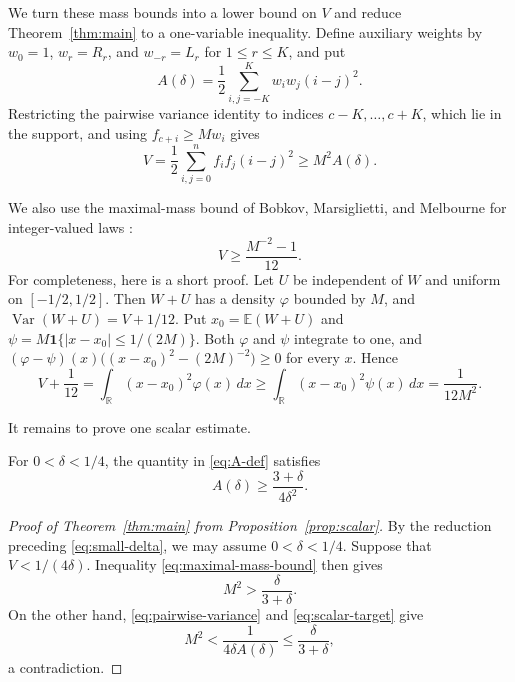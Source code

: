 \documentclass[ECP]{ejpecp}
\newcommand{\Var}{\operatorname{Var}}
\begin{document}
We turn these mass bounds into a lower bound on $V$ and reduce
Theorem~\ref{thm:main} to a one-variable inequality. Define auxiliary weights by $w_0=1$, $w_r=R_r$, and $w_{-r}=L_r$ for
$1\leq r\leq K$, and put
\begin{equation}\label{eq:A-def}
  A(\delta)=\frac12\sum_{i,j=-K}^K w_iw_j(i-j)^2.
\end{equation}
Restricting the pairwise variance identity to indices $c-K,\ldots,c+K$, which
lie in the support, and using $f_{c+i}\geq Mw_i$ gives
\begin{equation}\label{eq:pairwise-variance}
  V=\frac12\sum_{i,j=0}^n f_if_j(i-j)^2
  \geq M^2A(\delta).
\end{equation}

We also use the maximal-mass bound of Bobkov, Marsiglietti, and Melbourne
for integer-valued laws
\cite[Corollary~3.2]{bobkovmarsigliettimelbourne2022}:
\begin{equation}\label{eq:maximal-mass-bound}
  V\geq\frac{M^{-2}-1}{12}.
\end{equation}
For completeness, here is a short proof. Let $U$ be independent of $W$ and
uniform on $[-1/2,1/2]$. Then $W+U$ has a density $\varphi$ bounded by $M$,
and $\Var(W+U)=V+1/12$. Put $x_0=\mathbb E(W+U)$ and
$\psi=M\mathbf 1\{|x-x_0|\leq1/(2M)\}$. Both $\varphi$ and $\psi$ integrate
to one, and $(\varphi-\psi)(x)\bigl((x-x_0)^2-(2M)^{-2}\bigr)\geq0$ for
every $x$. Hence
\[
  V+\frac1{12}
  =\int_{\mathbb R}(x-x_0)^2\varphi(x)\,dx
  \geq\int_{\mathbb R}(x-x_0)^2\psi(x)\,dx
  =\frac1{12M^2}.
\]

It remains to prove one scalar estimate.

\begin{proposition}\label{prop:scalar}
  For $0<\delta<1/4$, the quantity in \eqref{eq:A-def} satisfies
  \begin{equation}\label{eq:scalar-target}
    A(\delta)\geq\frac{3+\delta}{4\delta^2}.
  \end{equation}
\end{proposition}

\begin{proof}[Proof of Theorem~\ref{thm:main} from
  Proposition~\ref{prop:scalar}]
  By the reduction preceding \eqref{eq:small-delta}, we may assume
  $0<\delta<1/4$. Suppose that
  $V<1/(4\delta)$. Inequality \eqref{eq:maximal-mass-bound} then gives
  \[
    M^2>\frac{\delta}{3+\delta}.
  \]
  On the other hand, \eqref{eq:pairwise-variance} and
  \eqref{eq:scalar-target} give
  \[
    M^2<\frac1{4\delta A(\delta)}
    \leq\frac{\delta}{3+\delta},
  \]
  a contradiction.
\end{proof}
\end{document}
